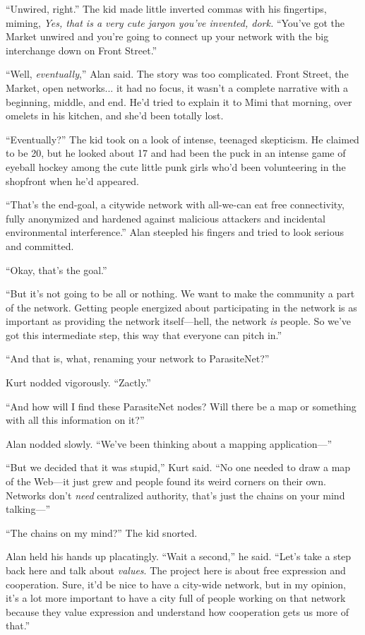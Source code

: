 ``Unwired, right.'' The kid made little inverted commas with his
fingertips, miming, \textit{Yes, that is a very cute jargon you've
invented, dork.} ``You've got the Market unwired and you're going to
connect up your network with the big interchange down on Front
Street.''

``Well, \textit{eventually},'' Alan said.  The story was too
complicated.  Front Street, the Market, open networks...  it had no
focus, it wasn't a complete narrative with a beginning, middle, and
end.  He'd tried to explain it to Mimi that morning, over omelets in
his kitchen, and she'd been totally lost.

``Eventually?'' The kid took on a look of intense, teenaged
skepticism.  He claimed to be 20, but he looked about 17 and had been
the puck in an intense game of eyeball hockey among the cute little
punk girls who'd been volunteering in the shopfront when he'd
appeared.

``That's the end-goal, a citywide network with all-we-can eat free
connectivity, fully anonymized and hardened against malicious
attackers and incidental environmental interference.'' Alan steepled
his fingers and tried to look serious and committed.

``Okay, that's the goal.''

``But it's not going to be all or nothing.  We want to make the
community a part of the network.  Getting people energized about
participating in the network is as important as providing the network
itself---hell, the network \textit{is} people.  So we've got this
intermediate step, this way that everyone can pitch in.''

``And that is, what, renaming your network to ParasiteNet?''

Kurt nodded vigorously.  ``Zactly.''

``And how will I find these ParasiteNet nodes?  Will there be a map or
something with all this information on it?''

Alan nodded slowly.  ``We've been thinking about a mapping
application---''

``But we decided that it was stupid,'' Kurt said.  ``No one needed to
draw a map of the Web---it just grew and people found its weird
corners on their own.  Networks don't \textit{need} centralized
authority, that's just the chains on your mind talking---''

``The chains on my mind?'' The kid snorted.

Alan held his hands up placatingly.  ``Wait a second,'' he said. 
``Let's take a step back here and talk about \textit{values}.  The
project here is about free expression and cooperation.  Sure, it'd be
nice to have a city-wide network, but in my opinion, it's a lot more
important to have a city full of people working on that network
because they value expression and understand how cooperation gets us
more of that.''

